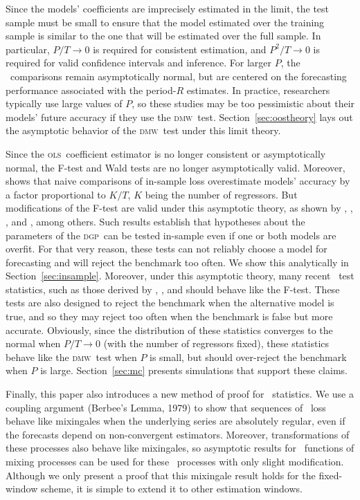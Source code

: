 \documentclass[11pt]{article}
\newcommand{\dmw}{\textsc{dmw}}
\newcommand{\ols}{\textsc{ols}}
\newcommand{\dgp}{\textsc{dgp}}
\begin{document}
Since the models' coefficients are imprecisely estimated in the limit,
the test sample must be small to ensure that the model estimated over
the training sample is similar to the one that will be estimated over
the full sample.  In particular, $P/T \to 0$ is required for
consistent estimation, and $P^2/T \to 0$ is required for valid
confidence intervals and inference.  For larger $P$, the \oos\
comparisons remain asymptotically normal, but are centered on the
forecasting performance associated with the period-$R$ estimates.  In
practice, researchers typically use large values of $P$, so these
studies may be too pessimistic about their models' future accuracy if
they use the \dmw\ test.  Section~\ref{sec:oostheory} lays out the
asymptotic behavior of the \dmw\ test under this limit theory.

Since the \ols\ coefficient estimator is no longer consistent or
asymptotically normal, the F-test and Wald tests are no longer
asymptotically valid.  Moreover, \citet{Efr:86,Efr:04} shows that
naive comparisons of in-sample loss overestimate models' accuracy by a
factor proportional to $K/T$, $K$ being the number of regressors.  But
modifications of the F-test are valid under this asymptotic theory, as
shown by \citet{BoB:95}, \citet{AkA:00}, \citet{AkP:04}, and
\citet{Cal:10}, among others.  Such results establish that hypotheses
about the parameters of the \dgp\ can be tested in-sample even if one
or both models are overfit.  For that very reason, these tests can not
reliably choose a model for forecasting and will reject the benchmark
too often.  We show this analytically in Section~\ref{sec:insample}.
Moreover, under this asymptotic theory, many recent \oos\ test
statistics, such as those derived by \cite{ClM:01,ClM:05},
\citet{Mcc:07}, and \citet{ClW:06,ClW:07} should behave like the
F-test.  These tests are also designed to reject the benchmark when
the alternative model is true, and so they may reject too often when
the benchmark is false but more accurate.  Obviously, since the
distribution of these statistics converges to the normal when $P/T \to
0$ (with the number of regressors fixed), these statistics behave like
the \dmw\ test when $P$ is small, but should over-reject the benchmark
when $P$ is large.  Section~\ref{sec:mc} presents simulations that
support these claims.

Finally, this paper also introduces a new method of proof for \oos\
statistics.  We use a coupling argument (Berbee's Lemma, 1979) to show
that sequences of \oos\ loss behave like mixingales when the
underlying series are absolutely regular, even if the forecasts depend
on non-convergent estimators.  Moreover, transformations of these
processes also behave like mixingales, so asymptotic results for \ned\
functions of mixing processes can be used for these \oos\ processes
with only slight modification.  Although we only present a proof that
this mixingale result holds for the fixed-window scheme, it is simple
to extend it to other estimation windows.
\end{document}
